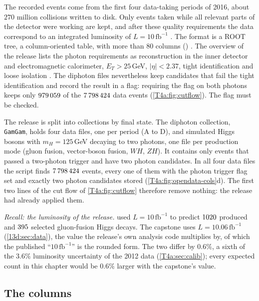 The recorded events come from the first four data-taking periods of 2016, about $270$ million collisions written to disk. Only events taken while all relevant parts of the detector were working are kept, and after these quality requirements the data correspond to an integrated luminosity of $L=10\,\mathrm{fb^{-1}}$ \cite[Sec.~2]{SerkinOpenData2020}. The format is a ROOT tree, a column-oriented table, with more than $80$ columns () \cite[Sec.~2]{SerkinOpenData2020}. The overview of the release lists the photon requirements as reconstruction in the inner detector and electromagnetic calorimeter, $E_T>25$\,GeV, $\lvert\eta\rvert<2.37$, tight identification and loose isolation \cite[Table~1]{SerkinOpenData2020}. The diphoton files nevertheless keep candidates that fail the tight identification and record the result in a flag: requiring the flag on both photons keeps only $\num{979059}$ of the $\num{7798424}$ data events (\cref{T4a:fig:cutflow}). The flag must be checked.

The release is split into collections by final state. The diphoton collection, \texttt{GamGam}, holds four data files, one per period (A to D), and simulated Higgs bosons with $m_H=125$\,GeV decaying to two photons, one file per production mode (gluon fusion, vector-boson fusion, $WH$, $ZH$). It contains only events that passed a two-photon trigger and have two photon candidates. In all four data files the script  finds $\num{7798424}$ events, every one of them with the photon trigger flag set and exactly two photon candidates stored (\cref{T4a:fig:opendata-cols}d). The first two lines of the cut flow of \cref{T4a:fig:cutflow} therefore remove nothing: the release had already applied them.

\emph{Recall: the luminosity of the release.}  used $L=10\,\mathrm{fb^{-1}}$ to predict $1020$ produced and $395$ selected gluon-fusion Higgs decays. The capstone uses $L=10.06\,\mathrm{fb^{-1}}$ (\cref{13d:sec:data}), the value the release's own analysis code multiplies by, of which the published ``$10\,\mathrm{fb^{-1}}$'' is the rounded form. The two differ by $0.6\%$, a sixth of the $3.6\%$ luminosity uncertainty of the 2012 data (\cref{T4a:sec:calib}); every expected count in this chapter would be $0.6\%$ larger with the capstone's value.

\subsection{The columns}
\label{T4a:sec:columns}

